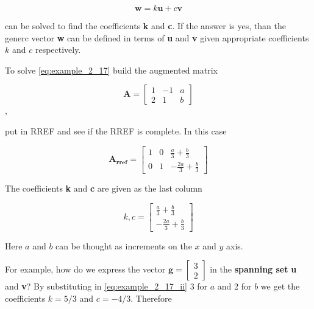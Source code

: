 \begin{equation}\label{eq:example_2_17}
\mathbf{w} = k\mathbf{u}  + c\mathbf{v}
\end{equation}

can be solved to find the coefficients \textbf{k} and \textbf{c}.
If the answer is yes, than the generc vector \textbf{w} can be defined in terms
of \textbf{u} and \textbf{v} given appropriate coefficients $k$ and $c$ respectively.

To solve \ref{eq:example_2_17} build the augmented matrix

$$\mathbf{A} =
\left[\begin{matrix}1 & -1 & a\\2 & 1 & b\end{matrix}\right]$$,

put in RREF and see if the RREF is complete. In this case

$$\mathbf{A_{rref}} = \left[\begin{matrix}1 & 0 & \frac{a}{3} + \frac{b}{3}\\0 & 1 & - \frac{2 a}{3} + \frac{b}{3}\end{matrix}\right]$$

The coefficients \textbf{k} and \textbf{c} are given as the last column

\begin{equation}\label{eq:example_2_17_ii}
k, c= \left[\begin{matrix}\frac{a}{3} + \frac{b}{3}\\- \frac{2 a}{3} + \frac{b}{3}\end{matrix}\right]
\end{equation}

Here $a$ and $b$ can be thought as increments on the $x$ and $y$ axis.

For example, how do we express the vector $\mathbf{g} = \left[\begin{matrix}3\\2\end{matrix}\right]$
in the \textbf{spanning set} \textbf{u} and \textbf{v}? By substituting in \ref{eq:example_2_17_ii}
3 for $a$ and 2 for $b$ we get the coefficients $k= 5/3$ and $c = -4/3$. Therefore

